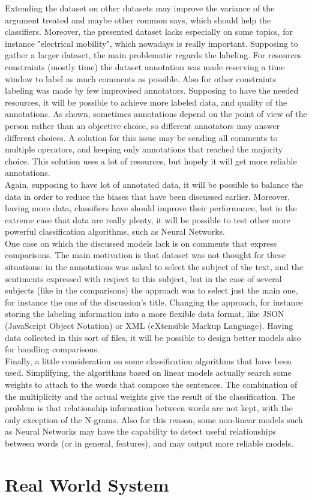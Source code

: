 Extending the dataset on other datasets may improve the variance of the argument treated and maybe other common says, which should help the classifiers. Moreover, the presented dataset lacks especially on some topics, for instance "electrical mobility", which nowadays is really important. Supposing to gather a larger dataset, the main problematic regards the labeling. For resources constraints (mostly time) the dataset annotation was made reserving a time window to label as much comments as possible. Also for other constraints labeling was made by few improvised annotators. Supposing to have the needed resources, it will be possible to achieve more labeled data, and quality of the annotations. As shown, sometimes annotations depend on the point of view of the person rather than an objective choice, so different annotators may answer different choices. A solution for this issue may be sending all comments to multiple operators, and keeping only annotations that reached the majority choice. This solution uses a lot of resources, but hopely it will get more reliable annotations.\\
Again, supposing to have lot of annotated data, it will be possible to balance the data in order to reduce the biases that have been discussed earlier. Moreover, having more data, classifiers have should improve their performance, but in the extreme case that data are really plenty, it will be possible to test other more powerful classification algorithms, such as Neural Networks.\\
One case on which the discussed models lack is on comments that express comparisons. The main motivation is that dataset was not thought for these situations: in the annotations was asked to select the subject of the text, and the sentiments expressed with respect to this subject, but in the case of several subjects (like in the comparisons) the approach was to select just the main one, for instance the one of the discussion's title. Changing the approach, for instance storing the labeling information into a more flexible data format, like JSON (JavaScript Object Notation) or XML (eXtensible Markup Language). Having data collected in this sort of files, it will be possible to design better models also for handling comparisons.\\
Finally, a little consideration on some classification algorithms that have been used. Simplifying, the algorithms based on linear models actually search some weights to attach to the words that compose the sentences. The combination of the multiplicity and the actual weights give the result of the classification. The problem is that relationship information between words are not kept, with the only exception of the N-grams. Also for this reason, some non-linear models such as Neural Networks may have the capability to detect useful relationships between words (or in general, features), and may output more reliable models.


\section{Real World System}

